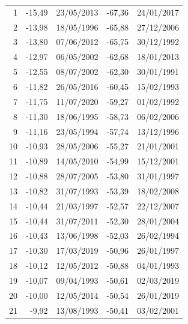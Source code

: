 \documentclass[a4paper,11pt]{extarticle}
\begin{document}
\begin{longtable}{|r|rl|rl|}
1         & -15,49          & 23/05/2013     & -67,36          & 24/01/2017     \\
2         & -13,98          & 18/05/1996     & -65,88          & 27/12/2006     \\
3         & -13,80          & 07/06/2012     & -65,75          & 30/12/1992     \\
4         & -12,97          & 06/05/2002     & -62,68          & 18/01/2013     \\
5         & -12,55          & 08/07/2002     & -62,30          & 30/01/1991     \\
6         & -11,82          & 26/05/2016     & -60,45          & 15/02/1993     \\
7         & -11,75          & 11/07/2020     & -59,27          & 01/02/1992     \\
8         & -11,30          & 18/06/1995     & -58,73          & 06/02/2006     \\
9         & -11,16          & 23/05/1994     & -57,74          & 13/12/1996     \\
10        & -10,93          & 28/05/2006     & -55,27          & 21/01/2001     \\
11        & -10,89          & 14/05/2010     & -54,99          & 15/12/2001     \\
12        & -10,88          & 28/07/2005     & -53,80          & 31/01/1997     \\
13        & -10,82          & 31/07/1993     & -53,39          & 18/02/2008     \\
14        & -10,44          & 21/03/1997     & -52,57          & 22/12/2007     \\
15        & -10,44          & 31/07/2011     & -52,30          & 28/01/2004     \\
16        & -10,43          & 13/06/1998     & -52,03          & 26/02/1994     \\
17        & -10,30          & 17/03/2019     & -50,96          & 26/01/1997     \\
18        & -10,12          & 12/05/2012     & -50,88          & 04/01/1993     \\
19        & -10,07          & 09/04/1993     & -50,61          & 02/03/2019     \\
20        & -10,00          & 12/05/2014     & -50,54          & 26/01/2019     \\
21        & -9,92           & 13/08/1993     & -50,41          & 03/02/2001     \\

\end{longtable}
\end{document}
